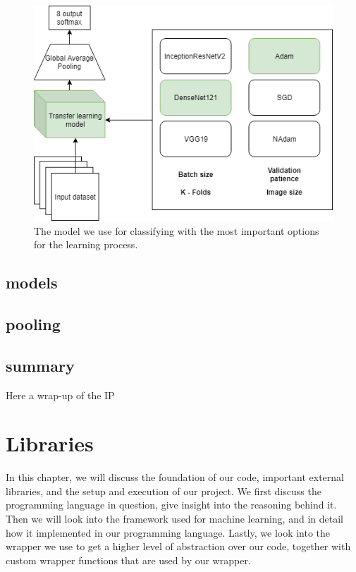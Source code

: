 \begin{figure}[h]
        \centering
        \includegraphics[scale=0.5]{experiments/figures/model.png}
        \caption{ The model we use for classifying with the most important options for the learning process. }
    \label{fig:KTLmodel}
\end{figure}


\subsection{models}

\subsection{pooling}


\subsection{summary}
Here a wrap-up of the IP











\section{Libraries} 
In this chapter, we will discuss the foundation of our code, important external libraries, and the setup and execution of our project.  
We first discuss the programming language in question, give insight into the reasoning behind it. Then we will look into the framework used for machine learning, and in detail how it implemented in our programming language. Lastly, we look into the wrapper we use to get a higher level of abstraction over our code, together with custom wrapper functions that are used by our wrapper. 

